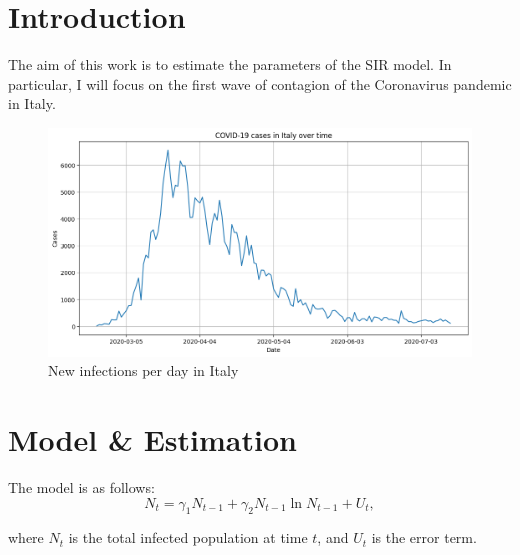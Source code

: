 \documentclass[12pt]{article}
\begin{document}
    \section{Introduction}
    The aim of this work is to estimate the parameters of the SIR model.
    In particular, I will focus on the first wave of contagion of the Coronavirus pandemic in Italy.

    \begin{figure}[h!]
        \label{fig:covid_italy}
        \centering
        \includegraphics[width=.8\linewidth]{plots/real_data}
        \caption{New infections per day in Italy}
    \end{figure}

\pagebreak

    \section{Model \& Estimation}
    The model is as follows:
    \begin{equation}
        N_{t} = \gamma_1 N_{t-1} + \gamma_2 N_{t-1}  \ln N_{t-1} + U_t,
        \label{eq:model_eq}
    \end{equation}

    where $N_t$ is the total infected population at time $t$, and $U_t$ is the error term.
\end{document}
